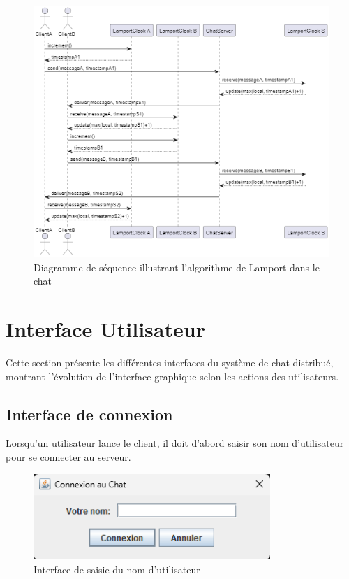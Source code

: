 \documentclass[a4paper,12pt]{article}
\begin{document}
\begin{figure}[ht!]
    \centering
    \includegraphics[width=1\textwidth]{sequence.png}
    \caption{Diagramme de séquence illustrant l'algorithme de Lamport dans le chat}
\end{figure}
\FloatBarrier

\section{Interface Utilisateur}
Cette section présente les différentes interfaces du système de chat distribué, montrant l'évolution de l'interface graphique selon les actions des utilisateurs.

\subsection{Interface de connexion}
Lorsqu'un utilisateur lance le client, il doit d'abord saisir son nom d'utilisateur pour se connecter au serveur.

\begin{figure}[ht!]
    \centering
    \includegraphics[width=0.8\textwidth]{name.png}
    \caption{Interface de saisie du nom d'utilisateur}
\end{figure}
\FloatBarrier
\end{document}
